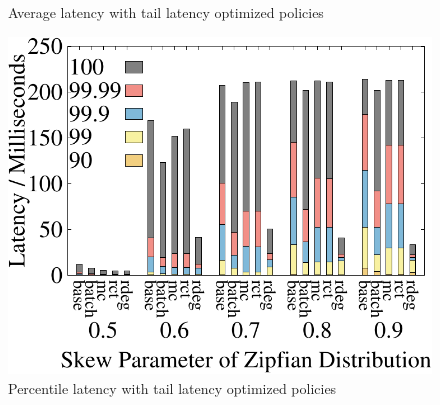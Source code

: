 \begin{figure}[t]
\begin{minipage}[b]{0.31\linewidth}
		\caption{Average latency with tail latency optimized policies}
		\label{fig:restart:latency}
	\end{minipage}
	\begin{minipage}[b]{0.31\linewidth}
	\centering
	\includegraphics[width=\textwidth]{./exp_fig/restart/percent100_latency}
	\caption{Percentile latency with tail latency optimized policies}
	\label{fig:restart:p100}
	\end{minipage}
\end{figure}




    
